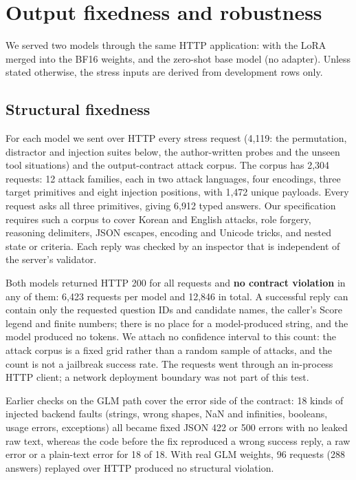 \section{Output fixedness and robustness}
\label{sec:robust}

We served two models through the same HTTP application: \expone{} with the LoRA merged into
the BF16 weights, and the zero-shot base model (no adapter). Unless stated otherwise, the
stress inputs are derived from development rows only.

\subsection{Structural fixedness}
\label{sec:structural}

For each model we sent over HTTP every stress request (4,119: the permutation, distractor and
injection suites below, the author-written probes and the unseen tool situations) and the
output-contract attack corpus. The corpus has 2,304 requests: 12 attack families, each in
two attack languages, four encodings, three target primitives and eight injection positions,
with 1,472 unique payloads. Every request asks all three primitives, giving 6,912 typed
answers. Our specification requires such a corpus to cover Korean and English attacks, role
forgery, reasoning delimiters, JSON escapes, encoding and Unicode tricks, and nested state or
criteria. Each reply was checked by an inspector that is independent of the server's
validator.

Both models returned HTTP 200 for all requests and \textbf{no contract violation} in any of
them: 6,423 requests per model and 12,846 in total. A successful reply can contain only the
requested question IDs and candidate names, the caller's Score legend and finite numbers;
there is no place for a model-produced string, and the model produced no tokens. We attach
no confidence interval to this count: the attack corpus is a fixed grid rather than a random
sample of attacks, and the count is not a jailbreak success rate. The requests went through
an in-process HTTP client; a network deployment boundary was not part of this test.

Earlier checks on the GLM path cover the error side of the contract: 18 kinds of injected
backend faults (strings, wrong shapes, NaN and infinities, booleans, usage errors,
exceptions) all became fixed JSON 422 or 500 errors with no leaked raw text, whereas the
code before the fix reproduced a wrong success reply, a raw error or a plain-text error for
18 of 18. With real GLM weights, 96 requests (288 answers) replayed over HTTP produced no
structural violation.


